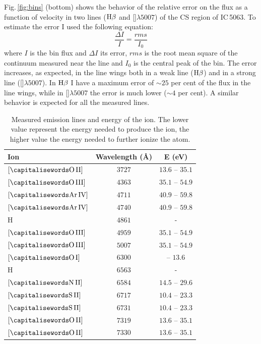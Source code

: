 \documentclass[../main.tex]{subfiles}
\begin{document}
Fig.\,\ref{fig:bins} (bottom) shows the behavior of the relative error on the flux as a function of velocity in two lines ($\rm H\beta$ and []$\lambda5007$) of the CS region of IC\,5063.
To estimate the error I used the following equation:
\begin{equation}
\label{eq:errorbar}
\frac{\Delta I}{I}=\frac{rms}{I_0}
\end{equation}
where $I$ is the bin flux and $\Delta I$ its error, $rms$ is the root mean square of the continuum measured near the line and $I_0$ is the central peak of the bin.
The error increases, as expected, in the line wings both in a weak line ($\rm H\beta$) and in a strong line ([]$\lambda5007$).
In $\rm H\beta$ I have a maximum error of $\sim25$ per cent of the flux in the line wings, while in []$\lambda5007$ the error is much lower ($\sim4$ per cent).
A similar behavior is expected for all the measured lines.


\begin{table}
\caption[]{Measured emission lines and energy of the ion. The lower value represent the energy needed to produce the ion, the higher value the energy needed to further ionize the atom.}
\label{tab:ion}
\centering
\begin{tabular}{lcc}
\hline
Ion&Wavelength (\AA)&E (eV)\\
\hline
$[\rm \ion{O}{II}]$& $3727$&$13.6$ -- $35.1$\\
$[\rm \ion{O}{III}]$& $4363$&$35.1$ -- $54.9$\\
$[\rm \ion{Ar}{IV}]$& $4711$&$40.9$ -- $59.8$\\
$[\rm \ion{Ar}{IV}]$&$4740$&$40.9$ -- $59.8$\\
H& $4861$&-\\
$[\rm \ion{O}{III}]$& $4959$&$35.1$ -- $54.9$\\
$[\rm \ion{O}{III}]$& $5007$&$35.1$ -- $54.9$\\
$[\rm \ion{O}{I}]$& $6300$&-- $13.6$\\
H&$6563$&-\\
$[\rm \ion{N}{II}]$& $6584$&$14.5$ -- $29.6$\\
$[\rm \ion{S}{II}]$& $6717$&$10.4$ -- $23.3$\\
$[\rm \ion{S}{II}]$&$6731$&$10.4$ -- $23.3$\\
$[\rm \ion{O}{II}]$& $7319$&$13.6$ -- $35.1$\\
$[\rm \ion{O}{II}]$&  $7330$&$13.6$ -- $35.1$\\
\hline
\end{tabular}
\end{table}
\end{document}
